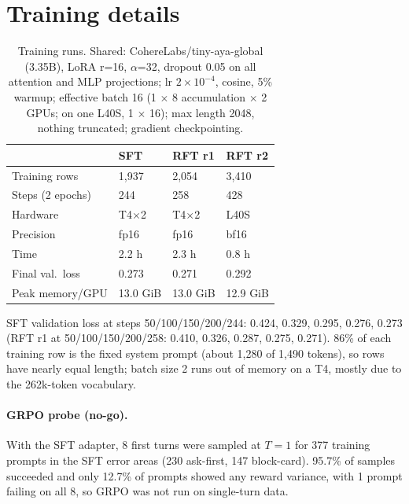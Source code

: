 \section{Training details}
\label{app:training}

\begin{table}[h]
\centering
\small
\setlength{\tabcolsep}{3pt}
\begin{tabular}{llll}
\toprule
 & SFT & RFT r1 & RFT r2 \\
\midrule
Training rows & 1,937 & 2,054 & 3,410 \\
Steps (2 epochs) & 244 & 258 & 428 \\
Hardware & T4$\times$2 & T4$\times$2 & L40S \\
Precision & fp16 & fp16 & bf16 \\
Time & 2.2 h & 2.3 h & 0.8 h \\
Final val.\ loss & 0.273 & 0.271 & 0.292 \\
Peak memory/GPU & 13.0 GiB & 13.0 GiB & 12.9 GiB \\
\bottomrule
\end{tabular}
\caption{Training runs. Shared: CohereLabs/tiny-aya-global (3.35B), LoRA r=16, $\alpha$=32, dropout 0.05 on all
attention and MLP projections; lr $2\times10^{-4}$, cosine, 5\% warmup; effective batch 16 (1 $\times$ 8 accumulation
$\times$ 2 GPUs; on one L40S, 1 $\times$ 16); max length 2048, nothing truncated; gradient checkpointing.}
\label{tab:train-runs}
\end{table}

SFT validation loss at steps 50/100/150/200/244: 0.424, 0.329, 0.295, 0.276, 0.273 (RFT r1 at 50/100/150/200/258:
0.410, 0.326, 0.287, 0.275, 0.271). 86\% of each training row is the fixed system prompt (about 1,280 of 1,490 tokens),
so rows have nearly equal length; batch size 2 runs out of memory on a T4, mostly due to the 262k-token vocabulary.

\paragraph{GRPO probe (no-go).} With the SFT adapter, 8 first turns were sampled at $T{=}1$ for 377 training prompts in
the SFT error areas (230 ask-first, 147 block-card). 95.7\% of samples succeeded and only 12.7\% of prompts showed any
reward variance, with 1 prompt failing on all 8, so GRPO was not run on single-turn data.

